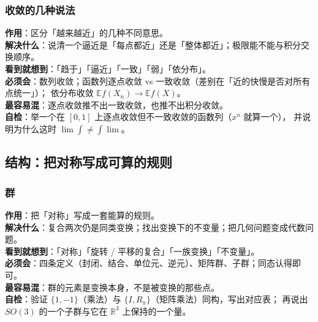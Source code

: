 \subsubsection*{收敛的几种说法}
\textbf{作用}：区分「越来越近」的几种不同意思。\\
\textbf{解决什么}：说清一个逼近是「每点都近」还是「整体都近」；极限能不能与积分交换顺序。\\
\textbf{看到就想到}：「趋于」「逼近」「一致」「弱」「依分布」。\\
\textbf{必须会}：数列收敛；函数列逐点收敛 vs 一致收敛（差别在「近的快慢是否对所有点统一」）；
依分布收敛 $\mathbb{E}f(X_{n})\to\mathbb{E}f(X)$。\\
\textbf{最容易混}：逐点收敛推不出一致收敛，也推不出积分收敛。\\
\textbf{自检}：举一个在 $[0,1]$ 上逐点收敛但不一致收敛的函数列（$x^{n}$ 就算一个），
并说明为什么这时 $\lim\int\ne\int\lim$。

\subsection{结构：把对称写成可算的规则}
\label{app:grp}

\subsubsection*{群}
\textbf{作用}：把「对称」写成一套能算的规则。\\
\textbf{解决什么}：复合两次仍是同类变换；找出变换下的不变量；把几何问题变成代数问题。\\
\textbf{看到就想到}：「对称」「旋转 / 平移的复合」「一族变换」「不变量」。\\
\textbf{必须会}：四条定义（封闭、结合、单位元、逆元）、矩阵群、子群；同态认得即可。\\
\textbf{最容易混}：群的元素是变换本身，不是被变换的那些点。\\
\textbf{自检}：验证 $\{1,-1\}$（乘法）与 $\{I,R_{\pi}\}$（矩阵乘法）同构，写出对应表；
再说出 $SO(3)$ 的一个子群与它在 $\mathbb{R}^{3}$ 上保持的一个量。
